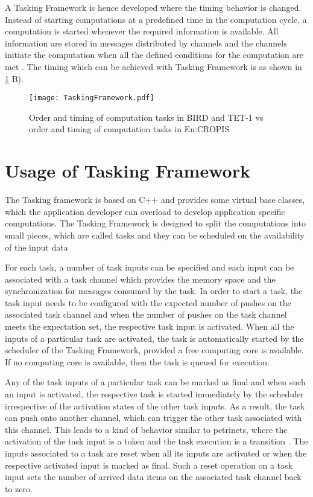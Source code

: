 A Tasking Framework is hence developed where the timing behavior is changed. Instead of starting computations at a predefined time in the computation cycle, a computation is started whenever the required information is available. All information are stored in messages distributed by channels and the channels initiate the computation when all the defined conditions for the computation are met \cite{TETBIRD}\cite{TETtoEUCROPIS}. The timing which can be achieved with Tasking Framework is as shown in \cref{fig: Tasking} B).    

\begin{figure}[h]
	\centering
	\texttt{[image: TaskingFramework.pdf]}
	\caption{Order and timing of computation tasks in BIRD and TET-1 vs order and timing of computation tasks in Eu:CROPIS}
	\label{fig: Tasking}
\end{figure}

\section{Usage of Tasking Framework}
The Tasking framework is based on C++ and provides some virtual base classes, which the application developer can overload to develop application specific computations. The Tasking Framework is designed to split the computations into small pieces, which are called tasks and they can be scheduled on the availability of the input data

For each task, a number of task inputs can be specified and each input can be associated with a task channel which provides the memory space and the synchronization for messages consumed by the task. In order to start a task, the task input needs to be configured with the expected number of pushes on the associated task channel and when the number of pushes on the task channel meets the expectation set, the respective task input is activated. When all the inputs of a particular task are activated, the task is automatically started by the scheduler of the Tasking Framework, provided a free computing core is available. If no computing core is available, then the task is queued for execution.

Any of the task inputs of a particular task can be marked as final and when such an input is activated, the respective task is started immediately by the scheduler irrespective of the activation states of the other task inputs. As a result, the task can push onto another channel, which can trigger the other task associated with this channel. This leads to a kind of behavior similar to petrinets, where the activation of the task input is a token and the task execution is a transition \cite{TaskFr}. The inputs associated to a task are reset when all its inputs are activated or when the respective activated input is marked as final. Such a reset operation on a task input sets the number of arrived data items on the associated task channel back to zero.


